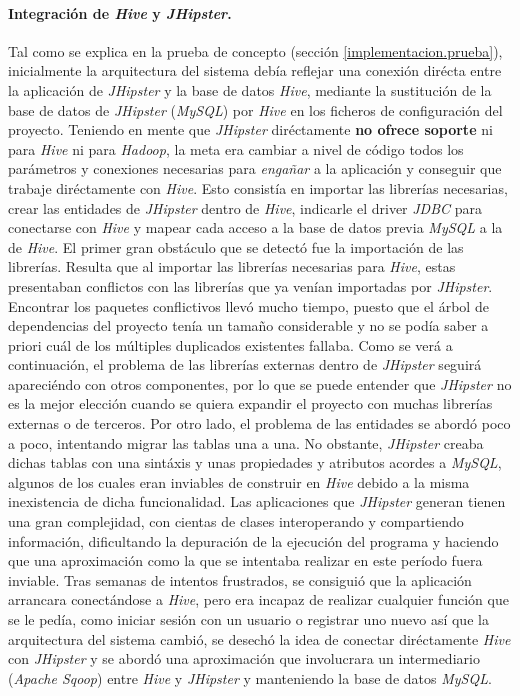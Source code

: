 \paragraph*{Integración de \textit{Hive} y \textit{JHipster}.} Tal como se explica en la prueba de concepto (sección \ref{implementacion.prueba}), inicialmente la arquitectura del sistema debía reflejar una conexión dirécta entre la aplicación de \textit{JHipster} y la base de datos \textit{Hive}, mediante la sustitución de la base de datos de \textit{JHipster} (\textit{MySQL}) por \textit{Hive} en los ficheros de configuración del proyecto. Teniendo en mente que \textit{JHipster} diréctamente \textbf{no ofrece soporte} ni para \textit{Hive} ni para \textit{Hadoop}, la meta era cambiar a nivel de código todos los parámetros y conexiones necesarias para \textit{engañar} a la aplicación y conseguir que trabaje diréctamente con \textit{Hive}. Esto consistía en importar las librerías necesarias, crear las entidades de \textit{JHipster} dentro de \textit{Hive}, indicarle el driver \textit{JDBC} para conectarse con \textit{Hive} y mapear cada acceso a la base de datos previa \textit{MySQL} a la de \textit{Hive}. El primer gran obstáculo que se detectó fue la importación de las librerías. Resulta que al importar las librerías necesarias para \textit{Hive}, estas presentaban conflictos con las librerías que ya venían importadas por \textit{JHipster}. Encontrar los paquetes conflictivos llevó mucho tiempo, puesto que el árbol de dependencias del proyecto tenía un tamaño considerable y no se podía saber a priori cuál de los múltiples duplicados existentes fallaba. Como se verá a continuación, el problema de las librerías externas dentro de \textit{JHipster} seguirá apareciéndo con otros componentes, por lo que se puede entender que \textit{JHipster} no es la mejor elección cuando se quiera expandir el proyecto con muchas librerías externas o de terceros. Por otro lado, el problema de las entidades se abordó poco a poco, intentando migrar las tablas una a una. No obstante, \textit{JHipster} creaba dichas tablas con una sintáxis y unas propiedades y atributos acordes a \textit{MySQL}, algunos de los cuales eran inviables de construir en \textit{Hive} debido a la misma inexistencia de dicha funcionalidad. Las aplicaciones que \textit{JHipster} generan tienen una gran complejidad, con cientas de clases interoperando y compartiendo información, dificultando la depuración de la ejecución del programa y haciendo que una aproximación como la que se intentaba realizar en este período fuera inviable. Tras semanas de intentos frustrados, se consiguió que la  aplicación arrancara conectándose a \textit{Hive}, pero era incapaz de realizar cualquier función que se le pedía, como iniciar sesión con un usuario o registrar uno nuevo así que la arquitectura del sistema cambió, se desechó la idea de conectar diréctamente \textit{Hive} con \textit{JHipster} y se abordó una aproximación que involucrara un intermediario (\textit{Apache Sqoop}) entre \textit{Hive} y \textit{JHipster} y manteniendo la base de datos \textit{MySQL}.

